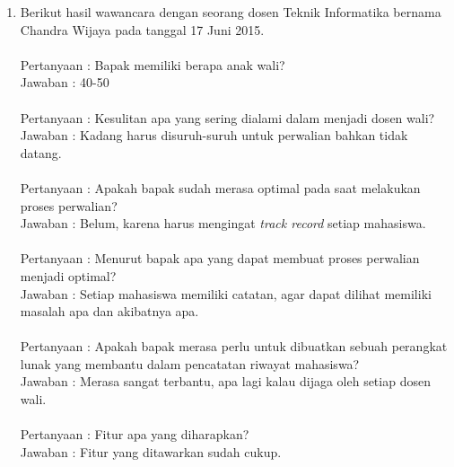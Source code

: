\begin{enumerate}
\item Berikut hasil wawancara dengan seorang dosen Teknik Informatika bernama Chandra Wijaya pada tanggal 17 Juni 2015.\\\\
Pertanyaan : Bapak memiliki berapa anak wali?\\
Jawaban : 40-50 \\\\
Pertanyaan : Kesulitan apa yang sering dialami dalam menjadi dosen wali?\\
Jawaban : Kadang harus disuruh-suruh untuk perwalian bahkan tidak datang.\\\\
Pertanyaan : Apakah bapak sudah merasa optimal pada saat melakukan proses perwalian?\\
Jawaban : Belum, karena harus mengingat {\it track record} setiap mahasiswa.\\\\
Pertanyaan : Menurut bapak apa yang dapat membuat proses perwalian menjadi optimal?\\
Jawaban : Setiap mahasiswa memiliki catatan, agar dapat dilihat memiliki masalah apa dan akibatnya apa.\\\\
Pertanyaan : Apakah bapak merasa perlu untuk dibuatkan sebuah perangkat lunak yang membantu dalam pencatatan riwayat mahasiswa?\\
Jawaban : Merasa sangat terbantu, apa lagi kalau dijaga oleh setiap dosen wali.\\\\
Pertanyaan : Fitur apa yang diharapkan?\\
Jawaban : Fitur yang ditawarkan sudah cukup.\\


\end{enumerate}

